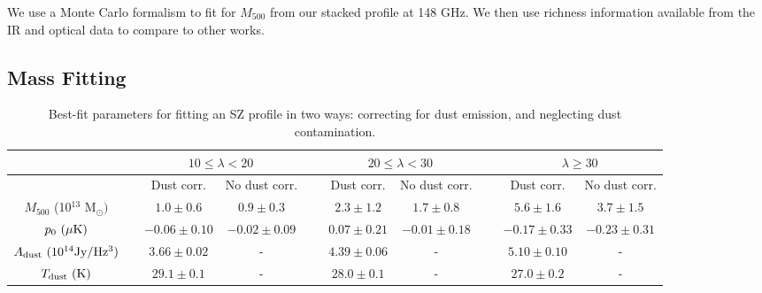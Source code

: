 \documentclass[a4paper,fleqn,usenatbib]{mnras}
\begin{document}
We use a Monte Carlo formalism to fit for $M_{500}$ from our stacked profile at 148 GHz. We then use richness information available from the IR and optical data to compare to other works.




\subsection{Mass Fitting}

\begin{table}
   
  \centering
  \caption{Best-fit parameters for fitting an SZ profile in two ways: correcting for dust emission, and neglecting dust contamination.}
  \begin{threeparttable}
  \begin{tabular}{|*{10}{c|}}
    \hline
    & & \multicolumn{2}{|c}{$10 \leq \lambda < 20$} & & \multicolumn{2}{|c|}{$20 \leq \lambda < 30$} & & \multicolumn{2}{|c|}{$\lambda \geq 30$}\\ \hline
    
    & & Dust corr. & No dust corr. & \ &  Dust corr. & No dust corr. & \ &  Dust corr. & No dust corr. \\ \hline
    
    $M_{500}$ (10$^{13}$ M$_{\odot})$ & & $1.0 \pm 0.6$ & $0.9 \pm 0.3$ & \ & $2.3 \pm 1.2$ & $1.7 \pm 0.8$ & \ & $5.6 \pm 1.6$ & $3.7 \pm 1.5$ \\ \hline
    
    $p_0 \ (\rm \mu K)$ & & $-0.06 \pm 0.10$ & $-0.02 \pm 0.09$ & \ & $0.07 \pm 0.21$ & $-0.01 \pm 0.18$ & \ & $-0.17 \pm 0.33$ & $-0.23 \pm 0.31$ \\ \hline
    
    $A_{\rm dust} \ (\rm 10^{14} Jy/Hz^3)$ & & $3.66 \pm 0.02$ & - & \ & $4.39 \pm 0.06$ & - & \ & $5.10 \pm 0.10$ & - \\ \hline
    
    $T_{\rm dust} \ (\rm K)$ & & $29.1 \pm 0.1$  & - & \ & $28.0 \pm 0.1$ & - & \ & $27.0 \pm 0.2$ & - \\ \hline %
    
    

\end{tabular}
\end{threeparttable}
\end{table}
\end{document}
